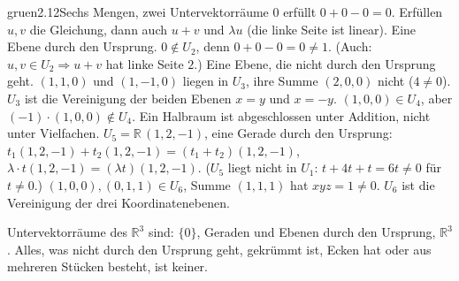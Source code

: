 \begin{loesungkarte}{gruen}{2.12}{Sechs Mengen, zwei Untervektorräume}
$0$ erfüllt $0 + 0 - 0 = 0$. Erfüllen $u, v$ die Gleichung, dann auch $u + v$ und $\lambda u$ (die linke Seite ist linear). Eine Ebene durch den Ursprung.
$0\notin U_2$, denn $0 + 0 - 0 = 0\neq1$. (Auch: $u, v\in U_2\Rightarrow u + v$ hat linke Seite $2$.) Eine Ebene, die nicht durch den Ursprung geht.
$(1, 1, 0)$ und $(1, -1, 0)$ liegen in $U_3$, ihre Summe $(2, 0, 0)$ nicht ($4\neq0$). $U_3$ ist die Vereinigung der beiden Ebenen $x = y$ und $x = -y$.
$(1, 0, 0)\in U_4$, aber $(-1)\cdot(1, 0, 0)\notin U_4$. Ein Halbraum ist abgeschlossen unter Addition, nicht unter Vielfachen.
$U_5 = \mathbb R\,(1, 2, -1)$, eine Gerade durch den Ursprung: $t_1(1, 2, -1) + t_2(1, 2, -1) = (t_1 + t_2)(1, 2, -1)$, $\lambda\cdot t(1, 2, -1) = (\lambda t)(1, 2, -1)$. ($U_5$ liegt nicht in $U_1$: $t + 4t + t = 6t\neq0$ für $t\neq0$.)
$(1, 0, 0), (0, 1, 1)\in U_6$, Summe $(1, 1, 1)$ hat $xyz = 1\neq0$. $U_6$ ist die Vereinigung der drei Koordinatenebenen.
\begin{mitnehmen}\kastentext
Untervektorräume des $\mathbb R^{3}$ sind: $\{0\}$, Geraden und Ebenen durch den Ursprung, $\mathbb R^{3}$. Alles, was nicht durch den Ursprung geht, gekrümmt ist, Ecken hat oder aus mehreren Stücken besteht, ist keiner.
\end{mitnehmen}
\end{loesungkarte}

